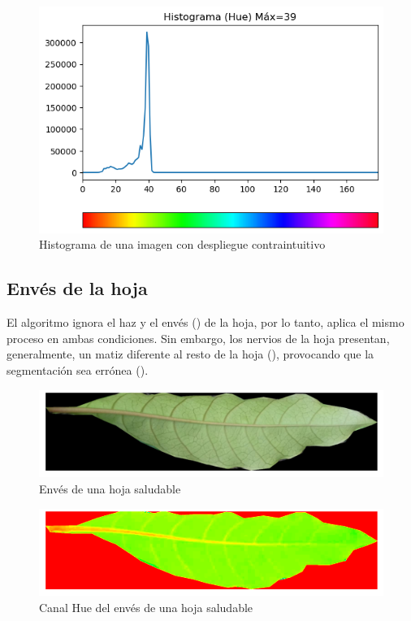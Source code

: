 \begin{figure}[H]
\centering
\includegraphics[width=\textwidth]{images/special_case_light_2_histogram.png}
\caption{Histograma de una imagen con despliegue contraintuitivo}
\label{img:light_2_binary}
\end{figure}

\subsection{Envés de la hoja}
El algoritmo ignora el haz y el envés () de la hoja, por lo tanto, aplica el mismo proceso en ambas condiciones. Sin embargo, los nervios de la hoja presentan, generalmente, un matiz diferente al resto de la hoja (), provocando que la segmentación sea errónea ().

\begin{figure}[H]
\centering
\includegraphics[scale=1]{images/special_case_backbone_rgb.png}
\caption{Envés de una hoja saludable}
\label{img:backbone_rgb}
\end{figure}

\begin{figure}[H]
\centering
\includegraphics[scale=1]{images/special_case_backbone_hue.png}
\caption{Canal Hue del envés de una hoja saludable}
\label{img:backbone_hue}
\end{figure}

